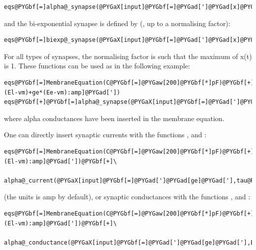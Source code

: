 \documentclass[letterpaper,10pt,english]{manual}
\begin{document}
\begin{Verbatim}[commandchars=@\[\]]
eqs@PYGbf[=]alpha@_synapse(@PYGaX[input]@PYGbf[=]@PYGad[']@PYGad[x]@PYGad['],tau@PYGbf[=]@PYGaw[10]@PYGbf[*]ms,unit@PYGbf[=]amp)
\end{Verbatim}

and the bi-exponential synapse is defined by (,
up to a normalising factor):

\begin{Verbatim}[commandchars=@\[\]]
eqs@PYGbf[=]biexp@_synapse(@PYGaX[input]@PYGbf[=]@PYGad[']@PYGad[x]@PYGad['],tau1@PYGbf[=]@PYGaw[10]@PYGbf[*]ms,tau2@PYGbf[=]@PYGaw[5]@PYGbf[*]ms,unit@PYGbf[=]amp)
\end{Verbatim}

For all types of synapses, the normalising factor is such that the maximum of x(t) is 1.
These functions can be used as in the following example:

\begin{Verbatim}[commandchars=@\[\]]
eqs@PYGbf[=]MembraneEquation(C@PYGbf[=]@PYGaw[200]@PYGbf[*]pF)@PYGbf[+]Current(@PYGad[']@PYGad[I=gl*(El-vm)+ge*(Ee-vm):amp]@PYGad['])
eqs@PYGbf[+]@PYGbf[=]alpha@_synapse(@PYGaX[input]@PYGbf[=]@PYGad[']@PYGad[ge@_in]@PYGad['],tau@PYGbf[=]@PYGaw[10]@PYGbf[*]ms,unit@PYGbf[=]siemens,output@PYGbf[=]@PYGad[']@PYGad[ge]@PYGad['])
\end{Verbatim}

where alpha conductances have been inserted in the membrane equation.

One can directly insert synaptic currents with the functions , 
and :

\begin{Verbatim}[commandchars=@\[\]]
eqs@PYGbf[=]MembraneEquation(C@PYGbf[=]@PYGaw[200]@PYGbf[*]pF)@PYGbf[+]Current(@PYGad[']@PYGad[I=gl*(El-vm):amp]@PYGad['])@PYGbf[+]\
    alpha@_current(@PYGaX[input]@PYGbf[=]@PYGad[']@PYGad[ge]@PYGad['],tau@PYGbf[=]@PYGaw[10]@PYGbf[*]ms)
\end{Verbatim}

(the units is amp by default), or synaptic conductances with the functions , 
and \code{biexp\_conductance}:

\begin{Verbatim}[commandchars=@\[\]]
eqs@PYGbf[=]MembraneEquation(C@PYGbf[=]@PYGaw[200]@PYGbf[*]pF)@PYGbf[+]Current(@PYGad[']@PYGad[I=gl*(El-vm):amp]@PYGad['])@PYGbf[+]\
    alpha@_conductance(@PYGaX[input]@PYGbf[=]@PYGad[']@PYGad[ge]@PYGad['],E@PYGbf[=]@PYGaw[0]@PYGbf[*]mV,tau@PYGbf[=]@PYGaw[10]@PYGbf[*]ms)
\end{Verbatim}
\end{document}
